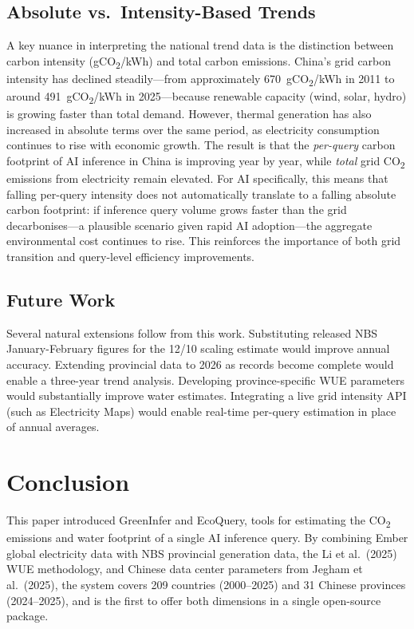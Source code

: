 \documentclass[11pt,a4paper]{article}
\begin{document}
\subsection{Absolute vs.\ Intensity-Based Trends}

A key nuance in interpreting the national trend data is the distinction
between carbon intensity (gCO\textsubscript{2}/kWh) and total carbon
emissions. China's grid carbon intensity has declined steadily---from
approximately 670~gCO\textsubscript{2}/kWh in 2011 to around
491~gCO\textsubscript{2}/kWh in 2025---because renewable capacity (wind,
solar, hydro) is growing faster than total demand. However, thermal
generation has also increased in absolute terms over the same period, as
electricity consumption continues to rise with economic growth. The result
is that the \emph{per-query} carbon footprint of AI inference in China is
improving year by year, while \emph{total} grid CO\textsubscript{2}
emissions from electricity remain elevated. For AI specifically, this
means that falling per-query intensity does not automatically translate
to a falling absolute carbon footprint: if inference query volume grows
faster than the grid decarbonises---a plausible scenario given rapid AI
adoption---the aggregate environmental cost continues to rise. This
reinforces the importance of both grid transition and query-level
efficiency improvements.

\subsection{Future Work}

Several natural extensions follow from this work. Substituting released NBS
January-February figures for the 12/10 scaling estimate would improve
annual accuracy. Extending provincial data to 2026 as records become
complete would enable a three-year trend analysis. Developing
province-specific WUE parameters would substantially improve water
estimates. Integrating a live grid intensity API (such as Electricity Maps)
would enable real-time per-query estimation in place of annual averages.

\section{Conclusion}

This paper introduced GreenInfer and EcoQuery, tools for estimating the
CO\textsubscript{2} emissions and water footprint of a single AI inference
query. By combining Ember global electricity data with NBS provincial
generation data, the Li et al.\ (2025) WUE methodology, and Chinese data
center parameters from Jegham et al.\ (2025), the system
covers 209 countries (2000--2025) and 31 Chinese provinces (2024--2025),
and is the first to offer both dimensions in a single open-source package.
\end{document}
